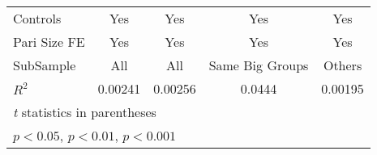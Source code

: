 {\begin{tabular}{l*{4}{c}}
Controls        &      Yes         &      Yes         &      Yes         &      Yes         \\
Pari Size FE    &      Yes         &      Yes         &      Yes         &      Yes         \\
SubSample       &      All         &      All         &Same Big Groups         &   Others         \\
$ R^2$          &  0.00241         &  0.00256         &   0.0444         &  0.00195         \\
\hline\hline
\multicolumn{5}{l}{\footnotesize \textit{t} statistics in parentheses}\\
\multicolumn{5}{l}{\footnotesize \sym{*} \(p<0.05\), \sym{**} \(p<0.01\), \sym{***} \(p<0.001\)}\\
\end{tabular}
}

